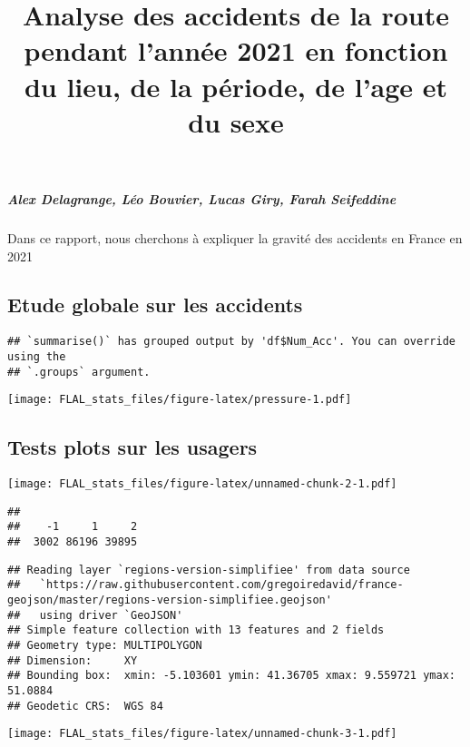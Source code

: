 \documentclass[
]{article}
\title{Analyse des accidents de la route pendant l'année 2021 en
fonction du lieu, de la période, de l'age et du sexe}
\author{}
\date{\vspace{-2.5em}}
\begin{document}
\maketitle

{
\setcounter{tocdepth}{2}
\tableofcontents
}
\hypertarget{alex-delagrange-luxe9o-bouvier-lucas-giry-farah-seifeddine}{%
\subparagraph{Alex Delagrange, Léo Bouvier, Lucas Giry, Farah
Seifeddine}\label{alex-delagrange-luxe9o-bouvier-lucas-giry-farah-seifeddine}}

Dans ce rapport, nous cherchons à expliquer la gravité des accidents en
France en 2021

\hypertarget{etude-globale-sur-les-accidents}{%
\subsection{Etude globale sur les
accidents}\label{etude-globale-sur-les-accidents}}

\begin{verbatim}
## `summarise()` has grouped output by 'df$Num_Acc'. You can override using the
## `.groups` argument.
\end{verbatim}

\texttt{[image: FLAL\_stats\_files/figure-latex/pressure-1.pdf]}

\hypertarget{tests-plots-sur-les-usagers}{%
\subsection{Tests plots sur les
usagers}\label{tests-plots-sur-les-usagers}}

\texttt{[image: FLAL\_stats\_files/figure-latex/unnamed-chunk-2-1.pdf]}

\begin{verbatim}
## 
##    -1     1     2 
##  3002 86196 39895
\end{verbatim}

\begin{verbatim}
## Reading layer `regions-version-simplifiee' from data source 
##   `https://raw.githubusercontent.com/gregoiredavid/france-geojson/master/regions-version-simplifiee.geojson' 
##   using driver `GeoJSON'
## Simple feature collection with 13 features and 2 fields
## Geometry type: MULTIPOLYGON
## Dimension:     XY
## Bounding box:  xmin: -5.103601 ymin: 41.36705 xmax: 9.559721 ymax: 51.0884
## Geodetic CRS:  WGS 84
\end{verbatim}

\texttt{[image: FLAL\_stats\_files/figure-latex/unnamed-chunk-3-1.pdf]}
\end{document}
